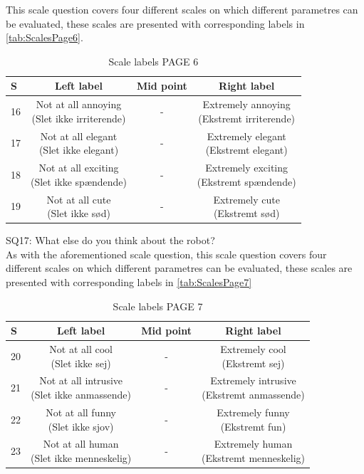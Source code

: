 This scale question covers four different scales on which different parametres can be evaluated, these scales are presented with corresponding labels in \autoref{tab:ScalesPage6}. 
%
\begin{table}[H]
	\centering
\caption{Scale labels PAGE 6}
	\label{tab:ScalesPage6} 
	\begin{tabular}{l|c|c|c}
		S     & Left label & Mid point & Right label \\\hline
		16   & \makecell{Not at all annoying\\(Slet ikke irriterende)}  & - & \makecell{Extremely annoying \\(Ekstremt irriterende)}        \\\hline
		17   & \makecell{Not at all elegant \\(Slet ikke elegant)} & - & \makecell{Extremely elegant \\(Ekstremt elegant)}         \\\hline
		18   & \makecell{Not at all exciting\\(Slet ikke spændende)} & - & \makecell{Extremely exciting \\(Ekstremt spændende)}         \\\hline
	 	19   & \makecell{Not at all cute\\(Slet ikke sød)} & - & \makecell{Extremely cute \\(Ekstremt sød)}               
	\end{tabular}        
\end{table}
\noindent
%
SQ17: What else do you think about the robot?\\%
As with the aforementioned scale question, this scale question covers four different scales on which different parametres can be evaluated, these scales are presented with corresponding labels in \autoref{tab:ScalesPage7}  
%
\begin{table}[H]
	\centering
\caption{Scale labels PAGE 7}
	\label{tab:ScalesPage7} 
	\begin{tabular}{l|c|c|c}
		S    & Left label & Mid point & Right label \\\hline
		20   & \makecell{Not at all cool\\(Slet ikke sej)}  & - & \makecell{Extremely cool \\(Ekstremt sej)}        \\\hline
		21   & \makecell{Not at all intrusive \\(Slet ikke anmassende)} & - & \makecell{Extremely intrusive \\(Ekstremt anmassende)}         \\\hline
		22   & \makecell{Not at all funny\\(Slet ikke sjov)} & - & \makecell{Extremely funny \\(Ekstremt fun)}         \\\hline
	 	23   & \makecell{Not at all human \\(Slet ikke menneskelig)} & - & \makecell{Extremely human \\(Ekstremt menneskelig)}               
	\end{tabular}        
\end{table}

